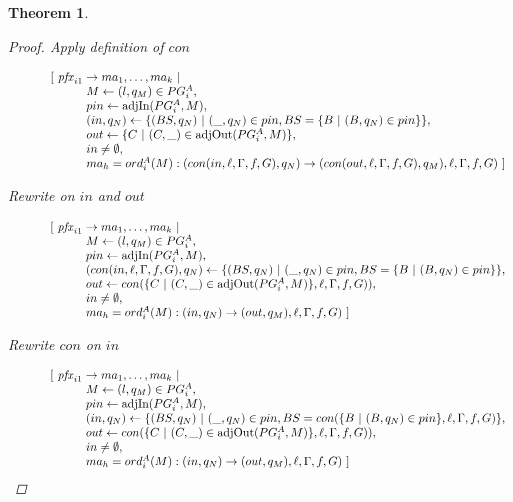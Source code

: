 \documentclass[twocolumn, openany]{sig-alternate-10pt}
\newtheorem{thm}{Theorem}
\begin{document}
\begin{thm}
\begin{proof}
  Apply definition of $con$

  \[ \begin{array}{l}
     ~~~~~~~~~ [~ \mathit{pfx}_{i1} \rightarrow ma_1, \dots, ma_k ~\vert~ \\
     ~~~~~~~~~~~~~~~~~~ M \leftarrow (l,q_M) \in PG^A_i, \\
     ~~~~~~~~~~~~~~~~~~ pin \leftarrow \text{adjIn}(PG^A_i,M), \\
     ~~~~~~~~~~~~~~~~~~ (in,q_N) \leftarrow \{ (BS,q_N) ~\vert~ (\_,q_N) \in pin, BS=\{B ~\vert~ (B,q_N) \in pin \} \}, \\
     ~~~~~~~~~~~~~~~~~~ out \leftarrow \{ C ~\vert~ (C,\_) \in \text{adjOut}(PG^A_i,M) \}, \\
     ~~~~~~~~~~~~~~~~~~ in \neq \emptyset, \\
     ~~~~~~~~~~~~~~~~~~ ma_h = ord^A_i(M) : (con(in,\ell,\Gamma,f,G),q_N) \rightarrow (con(out,\ell,\Gamma,f,G),q_M),\ell,\Gamma,f,G) ~] \\
  \end{array} \]%

  Rewrite on $in$ and $out$

  \[ \begin{array}{l}
     ~~~~~~~~~ [~ \mathit{pfx}_{i1} \rightarrow ma_1, \dots, ma_k ~\vert~ \\
     ~~~~~~~~~~~~~~~~~~ M \leftarrow (l,q_M) \in PG^A_i, \\
     ~~~~~~~~~~~~~~~~~~ pin \leftarrow \text{adjIn}(PG^A_i,M), \\
     ~~~~~~~~~~~~~~~~~~ (con(in,\ell,\Gamma,f,G),q_N) \leftarrow \{ (BS,q_N) ~\vert~ (\_,q_N) \in pin, BS=\{B ~\vert~ (B,q_N) \in pin \} \}, \\
     ~~~~~~~~~~~~~~~~~~ out \leftarrow con(\{ C ~\vert~ (C,\_) \in \text{adjOut}(PG^A_i,M) \},\ell,\Gamma,f,G)), \\
     ~~~~~~~~~~~~~~~~~~ in \neq \emptyset, \\
     ~~~~~~~~~~~~~~~~~~ ma_h = ord^A_i(M) : (in,q_N) \rightarrow (out,q_M),\ell,\Gamma,f,G) ~] \\
  \end{array} \]%

  Rewrite $con$ on $in$

  \[ \begin{array}{l}
     ~~~~~~~~~ [~ \mathit{pfx}_{i1} \rightarrow ma_1, \dots, ma_k ~\vert~ \\
     ~~~~~~~~~~~~~~~~~~ M \leftarrow (l,q_M) \in PG^A_i, \\
     ~~~~~~~~~~~~~~~~~~ pin \leftarrow \text{adjIn}(PG^A_i,M), \\
     ~~~~~~~~~~~~~~~~~~ (in,q_N) \leftarrow \{ (BS,q_N) ~\vert~ (\_,q_N) \in pin, BS=con(\{B ~\vert~ (B,q_N) \in pin \},\ell,\Gamma,f,G) \}, \\
     ~~~~~~~~~~~~~~~~~~ out \leftarrow con(\{ C ~\vert~ (C,\_) \in \text{adjOut}(PG^A_i,M) \},\ell,\Gamma,f,G)), \\
     ~~~~~~~~~~~~~~~~~~ in \neq \emptyset, \\
     ~~~~~~~~~~~~~~~~~~ ma_h = ord^A_i(M) : (in,q_N) \rightarrow (out,q_M),\ell,\Gamma,f,G) ~] \\
  \end{array} \]%


\end{proof}
\end{thm}
\end{document}

